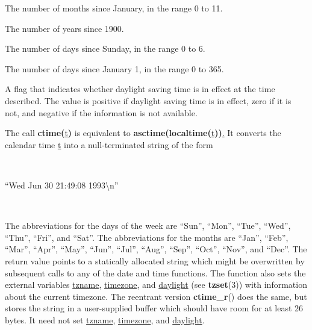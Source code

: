 \documentclass[]{article}
\let\realtextbf=\textbf
\renewcommand{\textbf}[1]{\textcolor{boldcolor}{\realtextbf{#1}}}
\renewcommand{\emph}[1]{\underline{#1}}
\begin{document}
\begin{description}
\itemsep1pt\parskip0pt
\item[\emph{tm\_mon}]
The number of months since January, in the range 0 to 11.
\end{description}

\begin{description}
\itemsep1pt\parskip0pt
\item[\emph{tm\_year}]
The number of years since 1900.
\end{description}

\begin{description}
\itemsep1pt\parskip0pt
\item[\emph{tm\_wday}]
The number of days since Sunday, in the range 0 to 6.
\end{description}

\begin{description}
\itemsep1pt\parskip0pt
\item[\emph{tm\_yday}]
The number of days since January 1, in the range 0 to 365.
\end{description}

\begin{description}
\itemsep1pt\parskip0pt
\item[\emph{tm\_isdst}]
A flag that indicates whether daylight saving time is in effect at the
time described. The value is positive if daylight saving time is in
effect, zero if it is not, and negative if the information is not
available.
\end{description}

The call \textbf{ctime(}\emph{t}\textbf{)} is equivalent to
\textbf{asctime(localtime(}\emph{t}\textbf{))}\emph{.} It converts the
calendar time \emph{t} into a null-terminated string of the form

~

``Wed Jun 30 21:49:08 1993\textbackslash{}n''

~

The abbreviations for the days of the week are ``Sun'', ``Mon'',
``Tue'', ``Wed'', ``Thu'', ``Fri'', and ``Sat''. The abbreviations for
the months are ``Jan'', ``Feb'', ``Mar'', ``Apr'', ``May'', ``Jun'',
``Jul'', ``Aug'', ``Sep'', ``Oct'', ``Nov'', and ``Dec''. The return
value points to a statically allocated string which might be overwritten
by subsequent calls to any of the date and time functions. The function
also sets the external variables \emph{tzname}, \emph{timezone}, and
\emph{daylight} (see \textbf{tzset}(3)) with information about the
current timezone. The reentrant version \textbf{ctime\_r}() does the
same, but stores the string in a user-supplied buffer which should have
room for at least 26 bytes. It need not set \emph{tzname},
\emph{timezone}, and \emph{daylight}.
\end{document}
